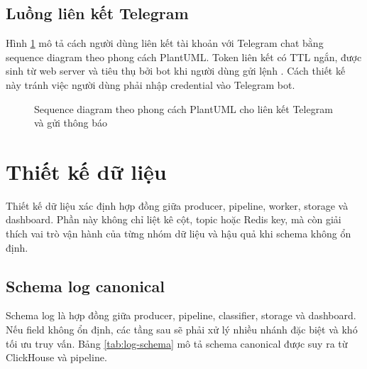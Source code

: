 \subsection{Luồng liên kết Telegram}

Hình \ref{fig:seq-telegram} mô tả cách người dùng liên kết tài khoản \LogRider{} với Telegram chat bằng sequence diagram theo phong cách PlantUML. Token liên kết có TTL ngắn, được sinh từ web server và tiêu thụ bởi bot khi người dùng gửi lệnh . Cách thiết kế này tránh việc người dùng phải nhập credential vào Telegram bot.

\begin{figure}[H]
\centering
\makebox[\textwidth][c]{}
\caption{Sequence diagram theo phong cách PlantUML cho liên kết Telegram và gửi thông báo}
\label{fig:seq-telegram}
\end{figure}

\section{Thiết kế dữ liệu}

Thiết kế dữ liệu xác định hợp đồng giữa producer, pipeline, worker, storage và dashboard. Phần này không chỉ liệt kê cột, topic hoặc Redis key, mà còn giải thích vai trò vận hành của từng nhóm dữ liệu và hậu quả khi schema không ổn định.

\subsection{Schema log canonical}

Schema log là hợp đồng giữa producer, pipeline, classifier, storage và dashboard. Nếu field không ổn định, các tầng sau sẽ phải xử lý nhiều nhánh đặc biệt và khó tối ưu truy vấn. Bảng \ref{tab:log-schema} mô tả schema canonical được suy ra từ ClickHouse và pipeline.

